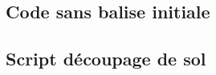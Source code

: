 \begin{appendices}
\appendix
\subsection*{Code sans balise initiale}

\subsection*{Script découpage de sol}

%
\end{appendices}